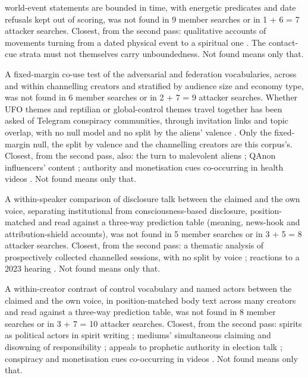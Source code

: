 {\begin{description}
world-event statements are bounded in time, with energetic predicates and date refusals kept out of scoring, was not
found in 9 member searches or in 1 + 6 = 7 attacker searches. Closest, from the second pass: qualitative accounts of
movements turning from a dated physical event to a spiritual one \cite{p12aveni2016apocalyptic,p12wojcik2021ufo}. The
contact-cue strata must not themselves carry unboundedness. Not found means only that.
\item[N26.] A fixed-margin co-use test of the adversarial and federation vocabularies, across and within channelling
creators and stratified by audience size and economy type, was not found in 6 member searches or in 2 + 7 = 9 attacker
searches. Whether UFO themes and reptilian or global-control themes travel together has been asked of Telegram
conspiracy communities, through invitation links and topic overlap, with no null model and no split by the aliens'
valence \cite{p12silva2024ufo}. Only the fixed-margin null, the split by valence and the channelling creators are this
corpus's. Closest, from the second pass, also: the turn to malevolent aliens \cite{p12partridge2004alien}; QAnon
influencers' content \cite{p12conner2023qanon}; authority and monetisation cues co-occurring in health videos
\cite{p12zarei2025visual}. Not found means only that.
\item[N27.] A within-speaker comparison of disclosure talk between the claimed and the own voice, separating
institutional from consciousness-based disclosure, position-matched and read against a three-way prediction table
(meaning, news-hook and attribution-shield accounts), was not found in 5 member searches or in 3 + 5 = 8 attacker
searches. Closest, from the second pass: a thematic analysis of prospectively collected channelled sessions, with no
split by voice \cite{p12wahbeh2026qualitative}; reactions to a 2023 hearing \cite{p12lomas2025unidentified}. Not found
means only that.
\item[N28.] A within-creator contrast of control vocabulary and named actors between the claimed and the own voice, in
position-matched body text across many creators and read against a three-way prediction table, was not found in 8
member searches or in 3 + 7 = 10 attacker searches. Closest, from the second pass: spirits as political actors in
spirit writing \cite{p12huwelmeier2019spirit}; mediums' simultaneous claiming and disowning of responsibility
\cite{p12tomlinson2025voice}; appeals to prophetic authority in election talk \cite{p12coker2021godsplaining};
conspiracy and monetisation cues co-occurring in videos \cite{p12zarei2025visual}. Not found means only that.

\end{description}}
